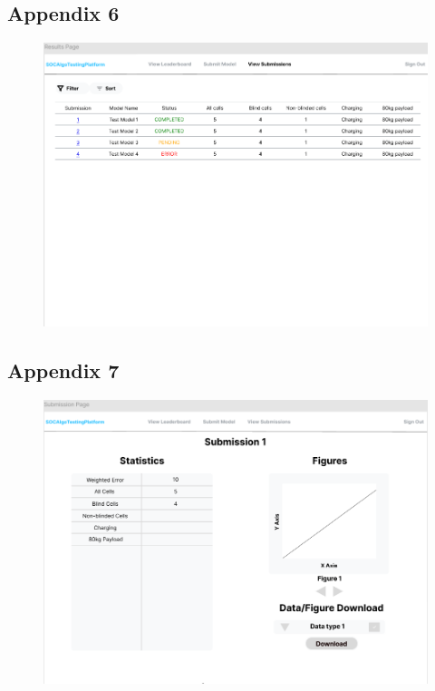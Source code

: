 \documentclass[12pt, titlepage]{article}
\begin{document}
\subsection{Appendix 6} \label{Appendix 6}
\begin{figure}[H]
    \centering
    \includegraphics[width=1\linewidth]{Design/SoftArchitecture/Interface/Results.png}
\end{figure}
\subsection{Appendix 7} \label{Appendix 7}
\begin{figure}[H]
    \centering
    \includegraphics[width=1\linewidth]{Design/SoftArchitecture/Interface/Submission.png}
\end{figure}
\end{document}
